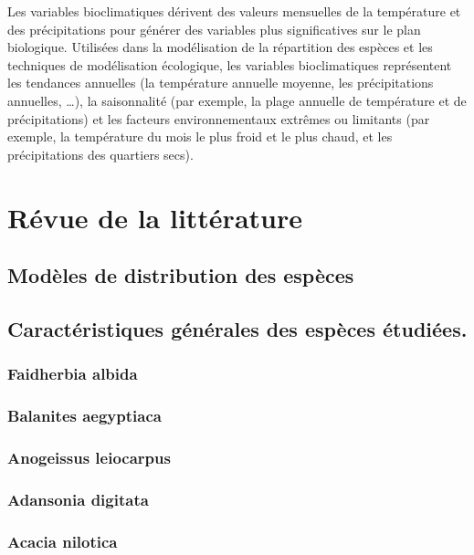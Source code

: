 \documentclass[a4paper, oneside, 12pt]{book}
\begin{document}
Les variables bioclimatiques dérivent des valeurs mensuelles de la température et des précipitations pour générer des variables plus significatives sur le plan biologique. Utilisées dans la modélisation de la répartition des espèces et les techniques de modélisation écologique, les variables bioclimatiques représentent les tendances annuelles (la température annuelle moyenne, les précipitations annuelles, …), la saisonnalité (par exemple, la plage annuelle de température et de précipitations) et les facteurs environnementaux extrêmes ou limitants (par exemple, la température du mois le plus froid et le plus chaud, et les précipitations des quartiers secs).


\chapter{Révue de la littérature}
\section{Modèles de distribution des espèces}
\section{Caractéristiques générales des espèces étudiées.}
\subsection{Faidherbia albida}
\subsection{Balanites aegyptiaca}
\subsection{Anogeissus leiocarpus}
\subsection{Adansonia digitata}
\subsection{Acacia nilotica}
\end{document}
